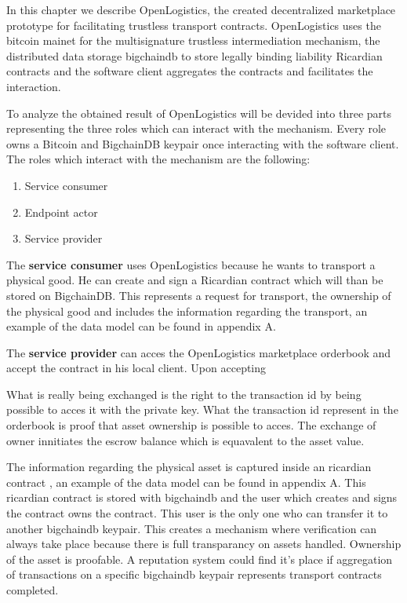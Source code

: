 In this chapter we describe OpenLogistics, the created decentralized  marketplace prototype for facilitating trustless transport contracts. OpenLogistics uses the bitcoin mainet for the multisignature trustless intermediation mechanism, the distributed data storage bigchaindb to store legally binding liability Ricardian contracts and the software client aggregates the contracts and facilitates the interaction. \par
To analyze the obtained result of OpenLogistics will be devided into three parts representing the three roles which can interact with the mechanism. Every role owns a Bitcoin and BigchainDB keypair once interacting with the software client. The roles which interact with the mechanism are the following:
\begin{enumerate}
  \item Service consumer
  \item Endpoint actor
  \item Service provider
\end{enumerate}
The \textbf{service consumer} uses OpenLogistics because he wants to transport a physical good. He can create and sign a Ricardian contract which will than be stored on BigchainDB. This represents a request for transport, the ownership of the physical good and includes the information regarding the transport, an example of the data model can be found in appendix A. \par
The \textbf{service provider} can acces the OpenLogistics marketplace orderbook and accept the contract in his local client. Upon accepting

What is really being exchanged is the right to the transaction id by being possible to acces it with the private key. What the transaction id represent in the orderbook is proof that asset ownership is possible to acces. The exchange of owner innitiates the escrow balance which is equavalent to the asset value.

The information regarding the physical asset is captured inside an ricardian contract \cite{}, an example of the data model can be found in appendix A. This ricardian contract is stored with bigchaindb and the user which creates and signs the contract owns the contract. This user is the only one who can transfer it to another bigchaindb keypair. This creates a mechanism where verification can always take place because there is full transparancy on assets handled. Ownership of the asset is proofable. A reputation system could find it's place if aggregation of transactions on a specific bigchaindb keypair represents transport contracts completed.

